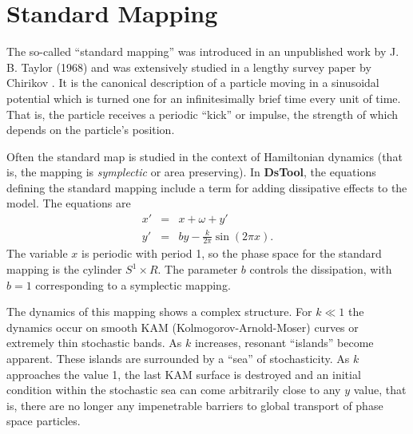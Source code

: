 \section{Standard Mapping}

The so-called ``standard mapping'' was introduced in an unpublished
work by J. B. Taylor (1968) and was extensively studied in a lengthy survey
paper by Chirikov \cite{chirikov}.  It is the canonical description of
a particle moving in a sinusoidal potential which is turned one for an
infinitesimally brief time every unit of time.  That is, the particle
receives a periodic ``kick'' or impulse, the strength of which depends
on the particle's position.

Often the standard map is studied in the context of Hamiltonian
dynamics (that is, the mapping is {\em symplectic} or area
preserving).  In {\bf DsTool}, the equations defining the standard
mapping include a term for adding dissipative effects to the model.
The equations are
\begin{eqnarray*}
  x' &=& x + \omega + y' \\
  y' &=& b y - \frac{k}{2 \pi} \sin(2 \pi x).
\end{eqnarray*}
The variable $x$ is periodic with period 1, so the phase space for the
standard mapping is the cylinder $S^1 \times R$.  The parameter $b$
controls the dissipation, with $b=1$ corresponding to a symplectic
mapping. 

The dynamics of this mapping shows a complex structure.  For $k \ll 1$
the dynamics occur on smooth KAM (Kolmogorov-Arnold-Moser) curves or
extremely thin stochastic bands. As $k$ increases, resonant ``islands''
become apparent.  These islands are surrounded by a ``sea'' of
stochasticity.  As $k$ approaches the value 1, the last KAM surface is
destroyed and an initial condition within the stochastic sea can come
arbitrarily close to any $y$ value, that is, there are no longer any
impenetrable barriers to global transport of phase space particles.